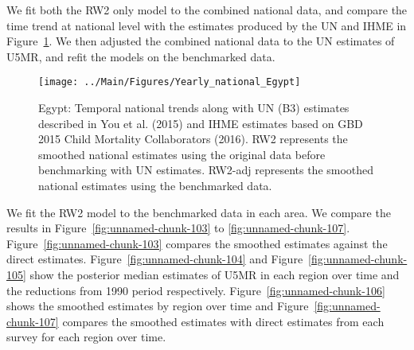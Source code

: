 \documentclass[12pt]{article}\usepackage[]{graphicx}\usepackage[]{color}
\newenvironment{knitrout}{}{} %
\begin{document}
We fit both the RW2 only model to the combined national data, and compare the time trend at national level with the estimates produced by the UN and IHME in Figure~\ref{fig:unnamed-chunk-102}. We then adjusted the combined national data to the UN estimates of U5MR, and refit the models on the benchmarked data. 

\begin{knitrout}
\color{fgcolor}\begin{figure}[bht]

{\centering \texttt{[image: ../Main/Figures/Yearly\_national\_Egypt]} 

}

\caption[Egypt]{Egypt: Temporal national trends along with UN (B3) estimates described in You et al. (2015) and IHME estimates based on GBD 2015 Child Mortality Collaborators (2016). RW2 represents the smoothed national estimates using the original data before benchmarking with UN estimates. RW2-adj represents the smoothed national estimates using the benchmarked data.}\label{fig:unnamed-chunk-102}
\end{figure}


\end{knitrout}
 

We fit the RW2 model to the benchmarked data in each area. 
We compare the results in Figure~\ref{fig:unnamed-chunk-103} to \ref{fig:unnamed-chunk-107}.
Figure~\ref{fig:unnamed-chunk-103} compares the smoothed estimates against the direct estimates. Figure~\ref{fig:unnamed-chunk-104} and Figure~\ref{fig:unnamed-chunk-105} show the posterior median estimates of U5MR in each region over time and the reductions from 1990 period respectively.
Figure~\ref{fig:unnamed-chunk-106} shows the smoothed estimates by region over time and Figure~\ref{fig:unnamed-chunk-107} compares the smoothed estimates with direct estimates from each survey for each region over time.




\end{document}
